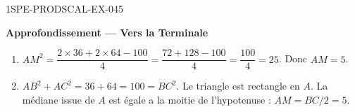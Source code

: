 \begin{corrige}{1SPE-PRODSCAL-EX-045}
\begin{center}\textbf{Approfondissement — Vers la Terminale}\end{center}
\begin{enumerate}
\item $AM^2 = \dfrac{2 \times 36 + 2 \times 64 - 100}{4} = \dfrac{72 + 128 - 100}{4} = \dfrac{100}{4} = 25$. Donc $AM = 5$.
\item $AB^2 + AC^2 = 36 + 64 = 100 = BC^2$. Le triangle est rectangle en $A$. La médiane issue de $A$ est égale a la moitie de l'hypotenuse : $AM = BC/2 = 5$. \checkmark
\end{enumerate}
\end{corrige}
